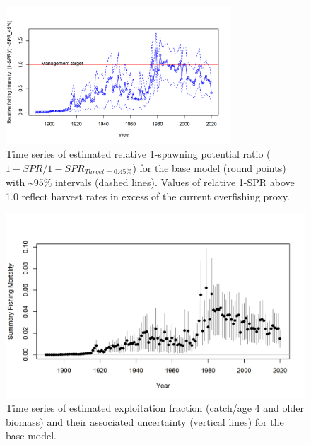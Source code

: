 \documentclass[11pt,
  english,
  a4paper,
]{article}
\begin{document}
\tagmcend\tagstructend


\begin{figure}
\centering
\includegraphics[width=0.75\textwidth,height=0.75\textheight]{figs/SPR3_ratiointerval.png}
\caption{Time series of estimated relative 1-spawning potential ratio ({\(1-SPR/1-SPR_{Target=0.45\%}\)\leavevmode\tagmcend\tagstructend}) for the base model (round points) with \textasciitilde95\% intervals (dashed lines). Values of relative 1-SPR above 1.0 reflect harvest rates in excess of the current overfishing proxy.\label{fig:SPR3}}
\end{figure}

\tagmcend\tagstructend


\begin{figure}
\centering
\includegraphics[width=1\textwidth,height=1\textheight]{figs/ts_summaryF.png}
\caption{Time series of estimated exploitation fraction (catch/age 4 and older biomass) and their associated uncertainty (vertical lines) for the base model.\label{fig:ts_summaryF}}
\end{figure}
\end{document}
